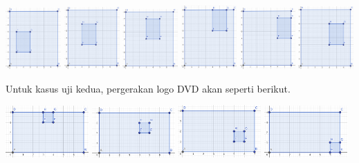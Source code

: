 \documentclass{article}
\begin{document}
\includegraphics[width=80px]{sample-1-1}
\includegraphics[width=80px]{sample-1-2}
\includegraphics[width=80px]{sample-1-3}
\includegraphics[width=80px]{sample-1-4}
\includegraphics[width=80px]{sample-1-5}
\includegraphics[width=80px]{sample-1-6}

Untuk kasus uji kedua, pergerakan logo DVD akan seperti berikut.

\includegraphics[width=120px]{sample-2-1}
\includegraphics[width=120px]{sample-2-2}
\includegraphics[width=120px]{sample-2-3}
\includegraphics[width=120px]{sample-2-4}

\pagebreak
\end{document}
